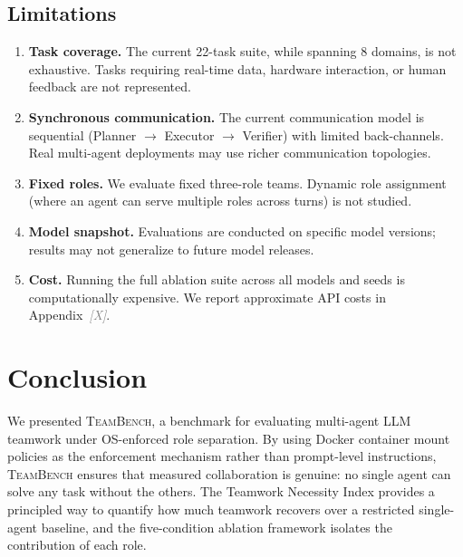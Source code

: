 \documentclass{article}
\newcommand{\teambench}{\textsc{TeamBench}}
\newcommand{\placeholder}[1]{\textcolor{gray}{\textit{[#1]}}}
\begin{document}
\subsection{Limitations}
\label{sec:discussion:limitations}

\begin{enumerate}
  \item \textbf{Task coverage.} The current 22-task suite, while spanning 8
        domains, is not exhaustive. Tasks requiring real-time data, hardware
        interaction, or human feedback are not represented.

  \item \textbf{Synchronous communication.} The current communication model
        is sequential (Planner $\to$ Executor $\to$ Verifier) with limited
        back-channels. Real multi-agent deployments may use richer
        communication topologies.

  \item \textbf{Fixed roles.} We evaluate fixed three-role teams. Dynamic
        role assignment (where an agent can serve multiple roles across turns)
        is not studied.

  \item \textbf{Model snapshot.} Evaluations are conducted on specific model
        versions; results may not generalize to future model releases.

  \item \textbf{Cost.} Running the full ablation suite across all models
        and seeds is computationally expensive. We report approximate API
        costs in Appendix~\placeholder{X}.
\end{enumerate}

\section{Conclusion}
\label{sec:conclusion}

We presented \teambench{}, a benchmark for evaluating multi-agent LLM teamwork
under OS-enforced role separation. By using Docker container mount policies
as the enforcement mechanism rather than prompt-level instructions,
\teambench{} ensures that measured collaboration is genuine: no single agent
can solve any task without the others. The Teamwork Necessity Index provides
a principled way to quantify how much teamwork recovers over a restricted
single-agent baseline, and the five-condition ablation framework isolates the
contribution of each role.
\end{document}
